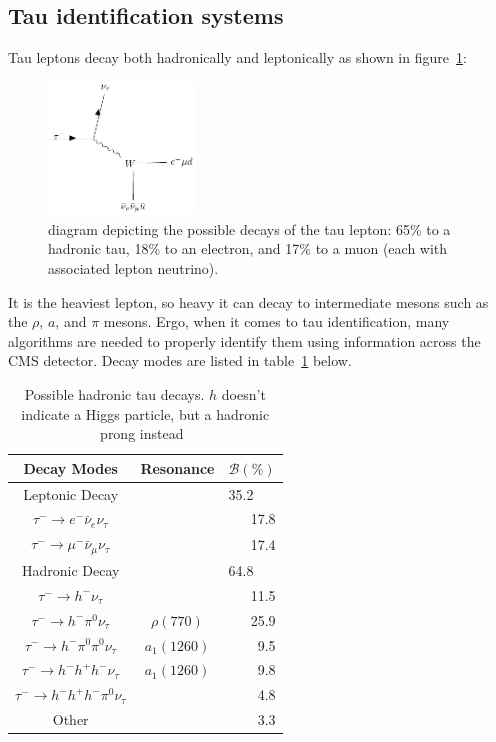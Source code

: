 \subsection{Tau identification systems}
\label{subsec:tauID}
Tau leptons decay both hadronically and leptonically as shown in figure~\ref{fig:taudecay}:
\begin{figure}[ht!b]
\label{fig:taudecay} 
\begin{center}
  \includegraphics[width=0.35\textwidth]{"figures/taudecay.pdf"}
    \caption{diagram depicting the possible decays of the tau lepton: 65\% to a hadronic tau, 18\% to an electron, and 17\% to a muon (each with associated lepton neutrino).}
\end{center}
\end{figure} 


It is the heaviest lepton, so heavy it can decay to intermediate mesons such as the $\rho$, $a$, and $\pi$ mesons. Ergo, when it comes to tau identification, many algorithms are needed to properly identify them using information across the CMS detector. Decay modes are listed in table~\ref{tab:taudecay} below. 

\begin{table}[h!tbp]
\centering
    \caption{Possible hadronic tau decays. $h$ doesn't indicate a Higgs particle, but a hadronic prong instead~\cite{Workman:2022}}
\label{tab:taudecay}
\begin{tabular}{c c r}
Decay Modes & Resonance & \multicolumn{1}{c}{$\mathcal{B}(\%)$} \\\hline
Leptonic Decay && \multicolumn{1}{l}{35.2}\\
$\tau^- \rightarrow e^- \bar{\nu}_e \nu_\tau $ & & 17.8 \\
$\tau^- \rightarrow \mu^- \bar{\nu}_\mu \nu_\tau$ & & 17.4 \\\hline
Hadronic Decay && \multicolumn{1}{l}{64.8}\\
$\tau^- \rightarrow h^-\nu_\tau$ & & 11.5 \\
$\tau^- \rightarrow h^-\pi^0 \nu_\tau$ & $\rho(770)$ & 25.9 \\
$\tau^- \rightarrow h^-\pi^0 \pi^0 \nu_\tau$ & $a_1(1260)$ & 9.5 \\
$\tau^- \rightarrow h^- h^+ h^- \nu_\tau$ & $a_1(1260)$ & 9.8 \\
$\tau^- \rightarrow h^- h^+ h^- \pi^0 \nu_\tau$ & & 4.8 \\
Other & & 3.3 \\\hline
\end{tabular}
\end{table}

